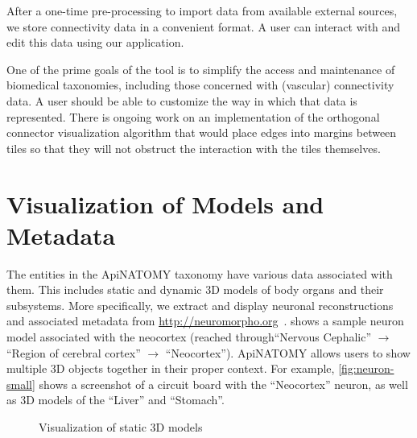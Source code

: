 After a one-time pre-processing to import data from available external sources, we store connectivity data in a convenient format. A user can interact with and edit this data using our application.

One of the prime goals of the tool is to simplify the access and maintenance of biomedical taxonomies, including those concerned with (vascular) connectivity data. A user should be able to customize the way in which that data is represented. There is ongoing work on an implementation of the orthogonal connector visualization algorithm that would place edges into margins between tiles so that they will not obstruct the interaction with the tiles themselves.


\section{Visualization of Models and Metadata} \label{sect:visualization2}               %

The entities in the ApiNATOMY taxonomy have various data associated with them. 
This includes static and dynamic 3D models of body organs and their subsystems. 
More specifically, we extract and display neuronal reconstructions and associated metadata from \url{http://neuromorpho.org}~\cite{Asc06}.
 shows a sample neuron model associated with the neocortex (reached through``Nervous Cephalic'' $\rightarrow$ ``Region of cerebral cortex'' $\rightarrow$ ``Neocortex''). ApiNATOMY allows users to show multiple 3D objects together in their proper context. For example, \cref{fig:neuron-small} shows a screenshot of a circuit board with the ``Neocortex'' neuron, as well as 3D models of the ``Liver'' and ``Stomach''.

\begin{figure}
\centering
  \vskip2mm
  \caption{Visualization of static 3D models}
  \label{fig:neurons}
\end{figure}

